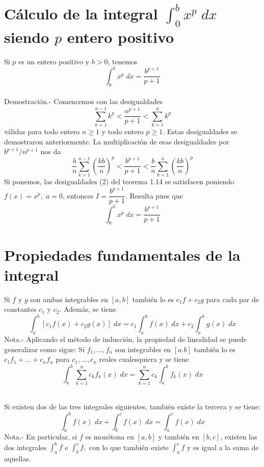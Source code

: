\section{Cálculo de la integral $\int_0^b x^p \; dx$ siendo $p$ entero positivo}

\begin{teo} Si $p$ es un entero positivo y $b>0$, tenemos $$\int_0^b x^p \; dx = \dfrac{b^{p+1}}{p+1}$$\\
    Demostración.-\; Comencemos con las desigualdades $$\sum\limits_{k=1}^{n-1} k^p < \dfrac{n^{p+1}}{p+1}<\sum\limits_{k=1}^n k^p$$
    válidas para todo entero $n\geq 1$ y todo entero $p\geq 1$. Estas desigualdades se demostraron anteriormente. La multiplicación de esas desigualdades por $b^{p+1}/n^{p+1}$ nos da $$\dfrac{b}{n} \sum\limits_{k=1}^{n-1} \left(\dfrac{kb}{n}\right)^p<\dfrac{b^{p+1}}{p+1}<\dfrac{b}{n}\sum\limits_{k=1}^{n}\left(\dfrac{kb}{n}\right)^p$$
    Si ponemos, las desigualdades (2) del teorema 1.14 se satisfacen poniendo $f(x)=x^p, \;a=0$, entonces $I=\dfrac{b^{p+1}}{p+1}$. Resulta pues que $$\int_0^b x^p \; dx=\dfrac{b^{p+1}}{p+1}$$
\end{teo}


\section{Propiedades fundamentales de la integral}

\begin{teo} Si $f$ y $g$ son ambas integrables en $[a,b]$ también lo es $c_1f+c_2g$ para cada par de constantes $c_1$ y $c_2$. Además, se tiene
    $$\int_a^b \left[c_1 f(x) + c_2g(x)\right]\; dx = c_1\int_a^b f(x) \; dx + c_2 \int_a^b g(x) \; dx$$
    Nota.- \; Aplicando el método de inducción, la propiedad de linealidad se puede generalizar como sigue: Si $f_1,...,f_n$ son integrables en $[a.b]$ también lo es $c_1f_1+...+c_nf_n$ para $c_1,...,c_n$ reales cualesquiera y se tiene $$\int_a^b \sum\limits_{k=1}^n c_kf_k(x)\; dx = \sum\limits_{k=1}^n c_k \int_a^b f_k(x)\; dx$$\\
\end{teo}

\begin{teo} Si existen dos de las tres integrales siguientes, también existe la tercera y se tiene: $$\int_a^b f(x) \; dx + \int_b^c f(x) \; dx = \int_a^c f(x) \; dx$$
    Nota.- \; En particular, si $f$ es monótona en $[a,b]$ y también en $[b,c]$, existen las dos integrales $\int_a^b f$ e $\int_b^c f,$ con lo que también existe $\int_a^c f$ y es igual a la suma de aquellas.\\\\
\end{teo}


